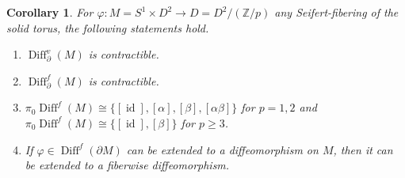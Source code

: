 \documentclass{amsart}
\theoremstyle{plain}
\newtheorem{cor}[thm]{Corollary}
\theoremstyle{definition}
\DeclareMathOperator\Diff{Diff}
\DeclareMathOperator{\id}{id}
\newcommand{\bbZ}{\mathbb{Z}}
\begin{document}
\begin{cor}\label{lem:solid-torus-facts}
    For $\varphi\colon M = S^1 \times D^2 \to D = D^2/(\bbZ/p)$ any Seifert-fibering of the solid torus, the following statements hold.
    \begin{enumerate}
        \item\label{it:Diffv-contractible} $\Diff_\partial^v(M)$ is contractible.
        \item\label{it:Difff-contractible} $\Diff_\partial^f(M)$ is contractible.
        \item\label{it:MCGf} $\pi_0\Diff^f(M) \cong \{ [\id], [\alpha], [\beta], [\alpha\beta]\}$ for $p=1,2$ and 
        $\pi_0\Diff^f(M) \cong \{ [\id], [\beta]\}$ for $p\ge 3$.
        \item\label{it:extend} 
        If $\varphi \in \Diff^f(\partial M)$ can be extended to a diffeomorphism on $M$, then it can be extended to a fiberwise diffeomorphism.
    \end{enumerate}
\end{cor}
\end{document}
